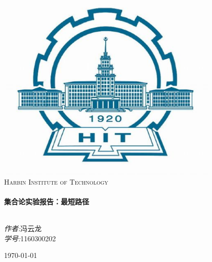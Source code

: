 \documentclass[a4paper,10pt]{ctexart}
\begin{document}
\begin{titlepage}

\begin{center}


\includegraphics[width=0.8\textwidth]{../Pics/HIT.eps}\\[1cm]

\textsc{\LARGE Harbin Institute of Technology}\\[1.5cm]

\hrulefill \\[0.4cm]
{ \huge \bfseries 集合论实验报告：最短路径}\\[0.4cm]
\hrulefill \\[1.5cm]

\begin{minipage}{0.4\textwidth}
\begin{flushleft} \large
\end{flushleft}
\end{minipage}
\begin{minipage}{0.4\textwidth}
\begin{flushright} \large
\emph{作者:}冯云龙 \\
\emph{学号:}1160300202
\end{flushright}
\end{minipage}

\vfill

{\large \today}

\end{center}
\end{titlepage}
\end{document}

